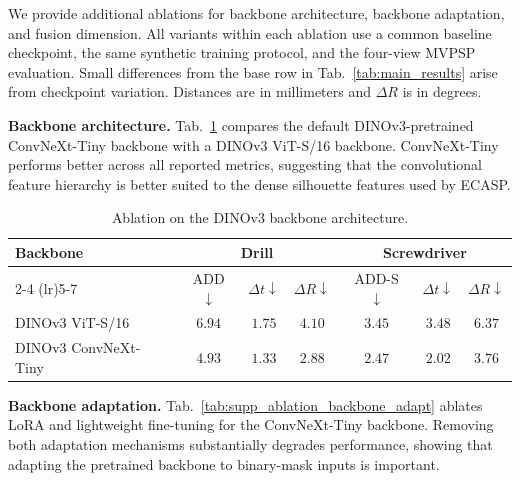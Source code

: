 
\label{supp:additional_ablations}
We provide additional ablations for backbone architecture, backbone
adaptation, and fusion dimension. All variants within each ablation use a
common baseline checkpoint, the same synthetic training protocol, and the
four-view MVPSP evaluation. Small differences from the base row in Tab.~\ref{tab:main_results} arise from checkpoint variation. Distances are in millimeters and
\(\Delta R\) is in degrees.

\noindent\textbf{Backbone architecture.}
Tab.~\ref{tab:supp_ablation_backbone_arch} compares the default
DINOv3-pretrained ConvNeXt-Tiny backbone with a DINOv3 ViT-S/16 backbone.
ConvNeXt-Tiny performs better across all reported metrics, suggesting that
the convolutional feature hierarchy is better suited to the dense
silhouette features used by ECASP.

\begin{table}[H]
\centering
\caption{Ablation on the DINOv3 backbone architecture.}
\label{tab:supp_ablation_backbone_arch}
\small
\setlength{\tabcolsep}{4.5pt}
\begin{tabular*}{\linewidth}{@{\extracolsep{\fill}}lcccccc@{}}
\toprule
\multirow{2}{*}{Backbone}
&
\multicolumn{3}{c}{Drill}
&
\multicolumn{3}{c}{Screwdriver}
\\
\cmidrule(lr){2-4}
\cmidrule(lr){5-7}
&
ADD \(\downarrow\)
&
\(\Delta t \downarrow\)
&
\(\Delta R \downarrow\)
&
ADD-S \(\downarrow\)
&
\(\Delta t \downarrow\)
&
\(\Delta R \downarrow\)
\\
\midrule
DINOv3 ViT-S/16
& \(6.94\)
& \(1.75\)
& \(4.10\)
& \(3.45\)
& \(3.48\)
& \(6.37\)
\\
DINOv3 ConvNeXt-Tiny
& \(\mathbf{4.93}\)
& \(\mathbf{1.33}\)
& \(\mathbf{2.88}\)
& \(\mathbf{2.47}\)
& \(\mathbf{2.02}\)
& \(\mathbf{3.76}\)
\\
\bottomrule
\end{tabular*}
\end{table}

\noindent\textbf{Backbone adaptation.}
Tab.~\ref{tab:supp_ablation_backbone_adapt} ablates LoRA and lightweight
fine-tuning for the ConvNeXt-Tiny backbone. Removing both adaptation
mechanisms substantially degrades performance, showing that adapting the
pretrained backbone to binary-mask inputs is important.

